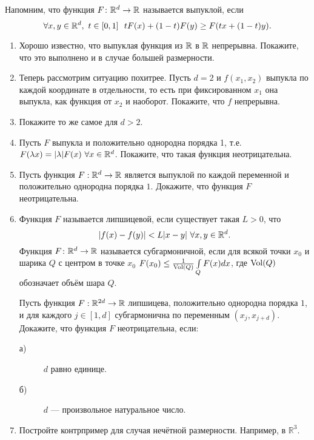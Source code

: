 Напомним, что функция $F\colon\mathbb{R}^d\to\mathbb{R}$ называется выпуклой, если
$$\forall x,y\in\mathbb{R}^d,\,\, t\in [0,1]\,\,\,\, tF(x)+(1-t)F(y)\geq F(tx+(1-t)y).$$
\begin{enumerate}
\item Хорошо известно, что выпуклая функция из $\mathbb{R}$ в $\mathbb{R}$ непрерывна. Покажите, что это выполнено и в случае большей размерности.
\item Теперь рассмотрим ситуацию похитрее. Пусть $d=2$ и $f(x_1, x_2)$ выпукла по каждой координате в отдельности, то есть при фиксированном $x_1$ она выпукла, как функция от $x_2$ и наоборот. Покажите, что $f$ непрерывна.
\item Покажите то же самое для $d>2$.
\item Пусть $F$ выпукла и положительно однородна порядка 1, т.е. $F(\lambda x)=|\lambda|F(x)\,\,\forall x\in \mathbb{R}^d$. Покажите, что такая функция неотрицательна.

\item Пусть функция $F: \mathbb{R}^d \to \mathbb{R}$ является выпуклой по каждой переменной и положительно однородна порядка $1$. Докажите, что функция $F$ неотрицательна.

\item Функция $F$ называется липшицевой, если существует такая $L>0$, что $$|f(x)-f(y)|<L|x-y|\,\, \forall x,y\in \mathbb{R}^d.$$ Функция $F\colon \mathbb{R}^d\to \mathbb{R}$ называется субгармоничной, если для всякой точки $x_0$ и шарика $Q$ с центром в точке $x_0$ ${F(x_0)} \leq \frac{1}{\operatorname{Vol}(Q)} \int\limits_{Q} F(x) dx $, где $\operatorname{Vol}(Q)$ обозначает объём шара $Q$.

 Пусть функция $F: \mathbb{R}^{2d} \to \mathbb{R}$ липшицева, положительно однородна порядка $1$, и для каждого $j \in [1,d]$ субгармонична по переменным $(x_j, x_{j+d})$.  Докажите, что функция $F$ неотрицательна, если:
\begin{description}
\item[а)] $d$ равно единице.
\item[б)] $d$ --- произвольное натуральное число.

\end{description}

\item Постройте контрпример для случая нечётной размерности. Например, в $\mathbb{R}^3$.
\end{enumerate}
